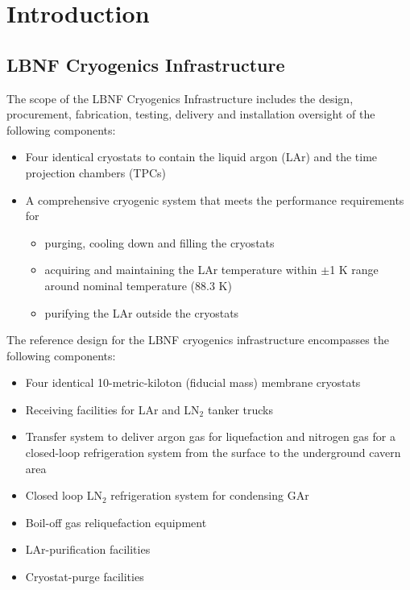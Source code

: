 \chapter{Introduction}
\label{ch:cryo-intro}

\section{LBNF Cryogenics Infrastructure}
\label{sec:cryo-intro-fd}

The scope of the LBNF Cryogenics Infrastructure includes the design, 
procurement, fabrication, testing, delivery and installation
oversight of the following components:
\begin{itemize}
 \item {Four identical cryostats to contain the liquid argon (LAr) 
       and the time projection chambers (TPCs)} 
 \item {A comprehensive cryogenic system that meets the performance 
       requirements for}
 \begin{itemize} 
  \item {purging, cooling down and filling the cryostats}
  \item {acquiring and maintaining the LAr temperature within 
        $\pm$1 K range around nominal temperature (88.3 K)} 
  \item {purifying the LAr outside the cryostats}
 \end{itemize}
\end{itemize}

The reference design for the LBNF cryogenics infrastructure 
encompasses the following components:

\begin{itemize}
\item Four identical 10-metric-kiloton (fiducial mass) membrane cryostats 
\item Receiving facilities for LAr and LN$_2$ tanker trucks 
\item Transfer system to deliver argon gas for liquefaction and 
      nitrogen gas for a closed-loop refrigeration system from the
      surface to the underground cavern area
\item Closed loop LN$_2$ refrigeration system for condensing GAr
\item Boil-off gas reliquefaction equipment
\item LAr-purification facilities
\item Cryostat-purge facilities
\end{itemize}


